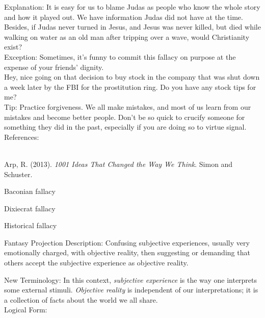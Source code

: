 \documentclass[a4paper,12pt,single,pdftex]{scrartcl}
\begin{document}
{    
      Explanation: It is easy for us to blame Judas as people who know the whole story and how it played out.  We have information Judas did not have at the time.  Besides, if Judas never turned in Jesus, and Jesus was never killed, but died while walking on water as an old man after tripping over a wave, would Christianity exist?
    \\

    
      Exception: Sometimes, it’s funny to commit this fallacy on purpose at the expense of your friends’ dignity.
    \\

    
      Hey, nice going on that decision to buy stock in the company that was shut down a week later by the FBI for the prostitution ring.  Do you have any stock tips for me?
    \\

    
      Tip: Practice forgiveness. We all make mistakes, and most of us learn from our mistakes and become better people. Don’t be so quick to crucify someone for something they did in the past, especially if you are doing so to virtue signal.
    \\

    References:

    
      
        
      \\

      
        
          Arp, R. (2013). {\it 1001 Ideas That Changed the Way We Think}. Simon and Schuster.
        
      
    
  }


Baconian fallacy

Dixiecrat fallacy

Historical fallacy

Fantasy Projection
    Description: Confusing subjective experiences, usually very emotionally charged, with objective reality, then suggesting or demanding that others accept the subjective experience as objective reality.

    
      New Terminology: In this context, {\em subjective experience}  is the way one interprets some external stimuli. {\em Objective reality}  is independent of our interpretations; it is a collection of facts about the world we all share.
    \\

    
      Logical Form:
    \\
\end{document}
